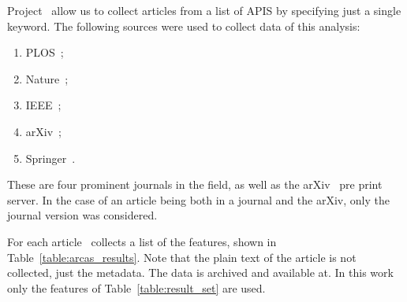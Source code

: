 \documentclass{article}
\theoremstyle{definition}
\begin{document}
Project~\cite{nikoleta_2017} allow us to collect articles from a list of APIS by
specifying just a single keyword. The following sources were used to collect data
of this analysis:

\begin{enumerate}
        \item PLOS~\cite{plos_one};
        \item Nature~\cite{nature};
        \item IEEE~\cite{ieee};
        \item arXiv~\cite{mckiernan2000};
        \item Springer~\cite{springer}.
\end{enumerate}

These are four prominent journals in the field, as well as the arXiv~\cite{mckiernan2000}
pre print server. In the case of an article being both in a journal and the arXiv,
only the journal version was considered.

For each article~\cite{nikoleta_2017} collects a list of the features, shown in Table~\ref{table:arcas_results}.
Note that the plain text of the article is not collected, just the metadata. The
data is archived and available at. %
In this work only the features of Table~\ref{table:result_set} are used.
\end{document}
